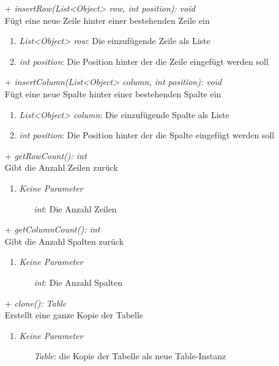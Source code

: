 \begin{itemize}
	\item[+] \textit{insertRow(List<Object> row, int position): void} \\
	Fügt eine neue Zeile hinter einer bestehenden Zeile ein
	\begin{enumerate}
		\item \textit{List<Object> row}: Die einzufügende Zeile als Liste
		\item \textit{int position}: Die Position hinter der die Zeile eingefügt werden soll
	\end{enumerate}

	\item[+] \textit{insertColumn(List<Object> column, int position): void} \\
	Fügt eine neue Spalte hinter einer bestehenden Spalte ein
	\begin{enumerate}
		\item \textit{List<Object> column}: Die einzufügende Spalte als Liste
		\item \textit{int position}: Die Position hinter der die Spalte eingefügt werden soll
	\end{enumerate}

	\item[+] \textit{getRowCount(): int} \\
	Gibt die Anzahl Zeilen zurück
	\begin{enumerate}
		\item \textit{Keine Parameter}
		\begin{itemize}
			\item[] \textit{int}: Die Anzahl Zeilen
		\end{itemize}
	\end{enumerate}

	\item[+] \textit{getColumnCount(): int} \\
	Gibt die Anzahl Spalten zurück
	\begin{enumerate}
		\item \textit{Keine Parameter}
		\begin{itemize}
			\item[] \textit{int}: Die Anzahl Spalten
		\end{itemize}
	\end{enumerate}
	
	\item[+] \textit{clone(): Table} \\
	Erstellt eine ganze Kopie der Tabelle
	\begin{enumerate}
		\item \textit{Keine Parameter}
		\begin{itemize}
			\item[] \textit{Table}: die Kopie der Tabelle als neue Table-Instanz
		\end{itemize}
	\end{enumerate}


\end{itemize}

